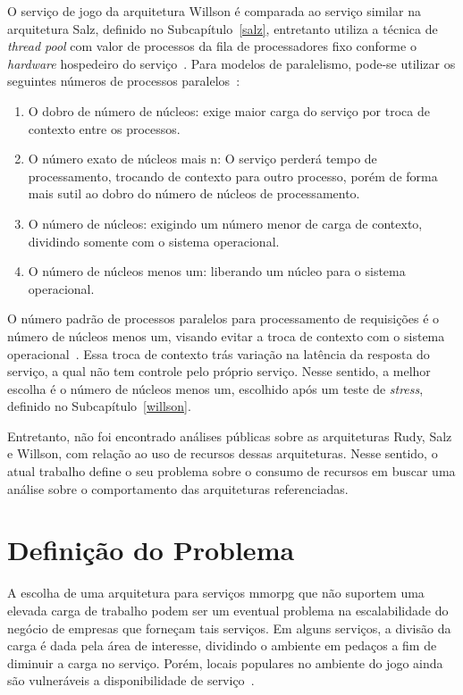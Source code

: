 O serviço de jogo da arquitetura Willson é comparada ao serviço similar na arquitetura Salz, definido no Subcapítulo~\ref{salz}, entretanto utiliza a técnica de \textit{thread pool} com valor de processos da fila de processadores fixo conforme o \textit{hardware} hospedeiro do serviço~\cite{stephenclarkewillson2017}.
%
Para modelos de paralelismo, pode-se utilizar os seguintes números de processos paralelos~\cite{willson}:


\begin{enumerate}
  \item O dobro de número de núcleos: exige maior carga do serviço por troca de contexto entre os processos.
  \item O número exato de núcleos mais n: O serviço perderá tempo de processamento, trocando de contexto para outro processo, porém de forma mais sutil ao dobro do número de núcleos de processamento.
  \item O número de núcleos: exigindo um número menor de carga de contexto, dividindo somente com o sistema operacional.
  \item O número de núcleos menos um: liberando um núcleo para o sistema operacional.
\end{enumerate}

O número padrão de processos paralelos para processamento de requisições é o número de núcleos menos um, visando evitar a troca de contexto com o sistema operacional~\cite{willson}.
%
Essa troca de contexto trás variação na latência da resposta do serviço, a qual não tem controle pelo próprio serviço.
%
Nesse sentido, a melhor escolha é o número de núcleos menos um, escolhido após um teste de \textit{stress}, definido no Subcapítulo~\ref{willson}.



Entretanto, não foi encontrado análises públicas sobre as arquiteturas Rudy, Salz e Willson, com relação ao uso de recursos dessas arquiteturas.
%
Nesse sentido, o atual trabalho define o seu problema sobre o consumo de recursos em buscar uma análise sobre o comportamento das arquiteturas referenciadas.


\section{Definição do Problema}



A escolha de uma arquitetura para serviços \ac{mmorpg} que não suportem uma elevada carga de trabalho podem ser um eventual problema na escalabilidade do negócio de empresas que forneçam tais serviços.
%
Em alguns serviços, a divisão da carga é dada pela área de interesse, dividindo o ambiente em pedaços a fim de diminuir a carga no serviço.
%
Porém, locais populares no ambiente do jogo ainda são vulneráveis a disponibilidade de serviço~\cite{1417630}.




